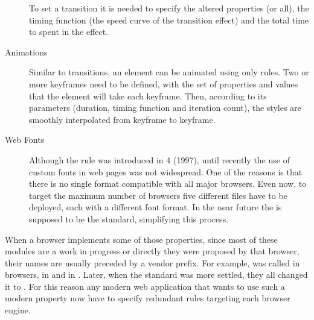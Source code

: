 \begin{description}
  To set a transition it is needed to specify the altered properties (or all), the timing function (the speed curve of the transition effect) and the total time to spent in the effect.
  \item[Animations] Similar to transitions, an element can be animated using only  rules.
  Two or more keyframes need to be defined, with the set of properties and values that the element will take each keyframe.
  Then, according to its parameters (duration, timing function and iteration count), the styles are smoothly interpolated from keyframe to keyframe.
  \item[Web Fonts] Although the  rule was introduced in 4 (1997), until recently the use of custom fonts in web pages was not widespread.
  One of the reasons is that there is no single format compatible with all major browsers.
  Even now, to target the maximum number of browsers five different files have to be deployed, each with a different font format.
  In the near future the  is supposed to be the standard, simplifying this process.
\end{description}

When a browser implements some of those properties, since most of these modules are a work in progress or directly they were proposed by that browser, their names are usually preceded by a vendor prefix.
For example,  was called  in  browsers,  in  and  in .
Later, when the standard was more settled, they all changed it to .
For this reason any modern web application that wants to use such a modern property now have to specify redundant rules targeting each browser engine.

